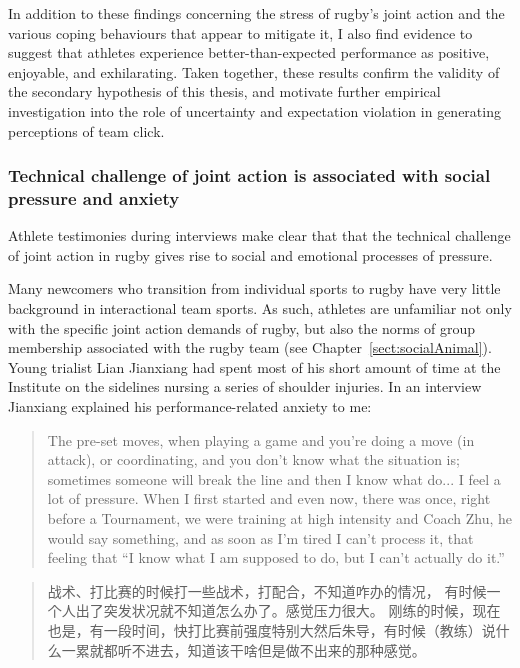 \begin{CJK}{UTF8}{gbsn}
In addition to these findings concerning the stress of rugby's joint action and the various coping behaviours that appear to mitigate it, I also find evidence to suggest that athletes experience better-than-expected performance as positive, enjoyable, and exhilarating.  Taken together, these results confirm the validity of the secondary hypothesis of this thesis, and motivate further empirical investigation into the role of uncertainty and expectation violation in generating perceptions of team click.


\subsubsection{Technical challenge of joint action is associated with social pressure and anxiety}

Athlete testimonies during interviews make clear that that the technical challenge of joint action in rugby gives rise to social and emotional processes of pressure.

Many newcomers who transition from individual sports to rugby have very little background in interactional team sports.  As such, athletes are unfamiliar not only with the specific joint action demands of rugby, but also the norms of group membership associated with the rugby team (see Chapter~\ref{sect:socialAnimal}).  Young trialist Lian Jianxiang had spent most of his short amount of time at the Institute on the sidelines nursing a series of shoulder injuries. In an interview Jianxiang explained his performance-related anxiety to me:

    \begin{quote}
      The pre-set moves, when playing a game and you're doing a move (in attack), or coordinating, and you don't know what the situation is; sometimes someone will break the line and then I know what do... I feel a lot of pressure.  When I first started and even now, there was once, right before a Tournament, we were training at high intensity and Coach Zhu, he would say something, and as soon as I'm tired I can't process it, that feeling that ``I know what I am supposed to do, but I can't actually do it.''
    \end{quote}

    \begin{quote}
      战术、打比赛的时候打一些战术，打配合，不知道咋办的情况， 有时候一个人出了突发状况就不知道怎么办了。感觉压力很大。 刚练的时候，现在也是，有一段时间，快打比赛前强度特别大然后朱导，有时候（教练）说什么一累就都听不进去，知道该干啥但是做不出来的那种感觉。
    \end{quote}


\end{CJK}
